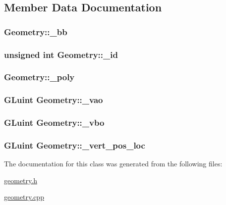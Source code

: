 \subsection{Member Data Documentation}
\hypertarget{class_geometry_a242426057d9d19b7c9a68a31eb0584d3}{
\subsubsection[{\+\_\+bb}]{ Geometry\+::\+\_\+bb}}\label{class_geometry_a242426057d9d19b7c9a68a31eb0584d3}
\hypertarget{class_geometry_afdd3cb26908cc8cd257caeb1af9376ef}{
\subsubsection[{\+\_\+id}]{\setlength{\rightskip}{0pt plus 5cm}unsigned int Geometry\+::\+\_\+id}}\label{class_geometry_afdd3cb26908cc8cd257caeb1af9376ef}
\hypertarget{class_geometry_a60904c40acf7a23b3fd28435278019c7}{
\subsubsection[{\+\_\+poly}]{ Geometry\+::\+\_\+poly}}\label{class_geometry_a60904c40acf7a23b3fd28435278019c7}
\hypertarget{class_geometry_ae8c3a8b756c681aa95bf7e0998f0a37d}{
\subsubsection[{\+\_\+vao}]{\setlength{\rightskip}{0pt plus 5cm}G\+Luint Geometry\+::\+\_\+vao}}\label{class_geometry_ae8c3a8b756c681aa95bf7e0998f0a37d}
\hypertarget{class_geometry_a66c15fff8a8a614e5f9734974354fd2e}{
\subsubsection[{\+\_\+vbo}]{\setlength{\rightskip}{0pt plus 5cm}G\+Luint Geometry\+::\+\_\+vbo}}\label{class_geometry_a66c15fff8a8a614e5f9734974354fd2e}
\hypertarget{class_geometry_a547d84fcd9258557891da46d19985544}{
\subsubsection[{\+\_\+vert\+\_\+pos\+\_\+loc}]{\setlength{\rightskip}{0pt plus 5cm}G\+Luint Geometry\+::\+\_\+vert\+\_\+pos\+\_\+loc}}\label{class_geometry_a547d84fcd9258557891da46d19985544}


The documentation for this class was generated from the following files\+:\begin{DoxyCompactItemize}
\item 
\hyperlink{geometry_8h}{geometry.\+h}\item 
\hyperlink{geometry_8cpp}{geometry.\+cpp}\end{DoxyCompactItemize}
